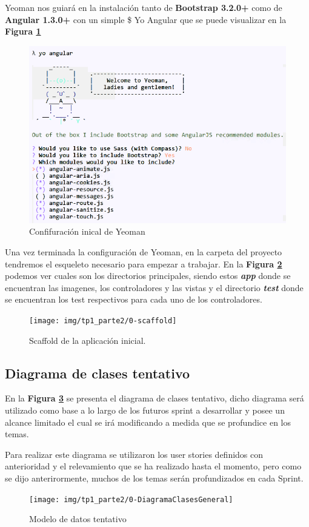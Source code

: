 Yeoman nos guiará en la instalación tanto de \textbf{Bootstrap 3.2.0+} como de  \textbf{Angular 1.3.0+} con un simple \$ Yo Angular que se puede visualizar en  la \textbf{Figura \ref{yeomanInstall}}

\begin{figure}[h]
  \centering
  \includegraphics[width=.4\textwidth]{img/tp1_parte2/0-instalacionConYeoman}
  \caption{Confifuración inical de Yeoman}
  \label{yeomanInstall}
\end{figure}

Una vez terminada la configuración de Yeoman, en la carpeta del proyecto tendremos el esqueleto necesario para empezar a trabajar. En la  \textbf{Figura \ref{scaffold}} podemos ver cuales son los directorios principales, siendo estos \textbf{\textit{app}} donde se encuentran las imagenes, los controladores y las vistas y el directorio \textbf{\textit{test}} donde se encuentran los test respectivos para cada uno de los controladores.

\begin{figure}[h]
  \centering
  \texttt{[image: img/tp1\_parte2/0-scaffold]}
  \caption{Scaffold de la aplicación inicial.}
  \label{scaffold}
\end{figure}

\subsection{Diagrama de clases tentativo}
En la \textbf{Figura \ref{2-modelo_datos_general}} se presenta el diagrama de clases tentativo, dicho diagrama  será utilizado como base a lo largo de los futuros sprint a desarrollar y posee un alcance limitado el cual se irá modificando a medida que se profundice en los temas.

Para realizar este diagrama se utilizaron los user stories definidos con anterioridad y el relevamiento que se ha realizado hasta el momento, pero como se dijo anterirormente, muchos de los temas serán profundizados en cada Sprint.

\begin{figure}
  \centering
  \texttt{[image: img/tp1\_parte2/0-DiagramaClasesGeneral]}
  \caption{Modelo de datos tentativo}
  \label{2-modelo_datos_general}
\end{figure}


\clearpage %
